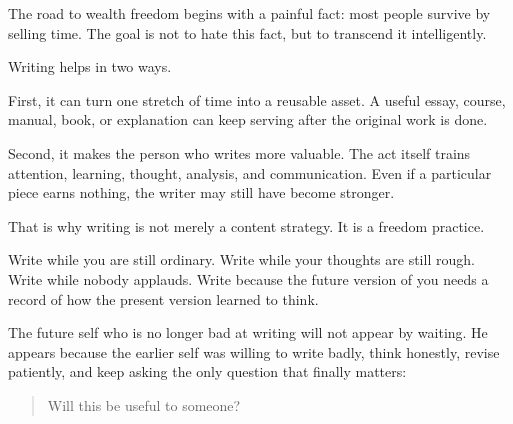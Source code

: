 The road to wealth freedom begins with a painful fact: most people survive by selling time. The goal is not to hate this fact, but to transcend it intelligently.

Writing helps in two ways.

First, it can turn one stretch of time into a reusable asset. A useful essay, course, manual, book, or explanation can keep serving after the original work is done.

Second, it makes the person who writes more valuable. The act itself trains attention, learning, thought, analysis, and communication. Even if a particular piece earns nothing, the writer may still have become stronger.

That is why writing is not merely a content strategy. It is a freedom practice.

Write while you are still ordinary. Write while your thoughts are still rough. Write while nobody applauds. Write because the future version of you needs a record of how the present version learned to think.

The future self who is no longer bad at writing will not appear by waiting. He appears because the earlier self was willing to write badly, think honestly, revise patiently, and keep asking the only question that finally matters:

\begin{quote}
Will this be useful to someone?
\end{quote}
